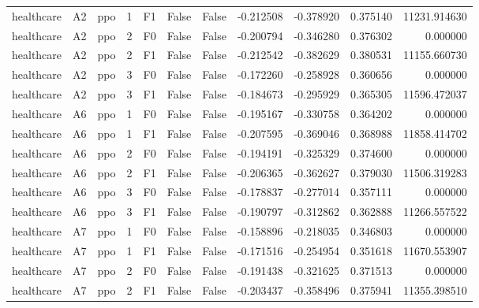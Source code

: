 \begin{tabular}{lllrlllrrrr}
healthcare &      A2 &       ppo &     1 &  F1 &           False &            False & -0.212508 & -0.378920 & 0.375140 &     11231.914630 \\
healthcare &      A2 &       ppo &     2 &  F0 &           False &            False & -0.200794 & -0.346280 & 0.376302 &         0.000000 \\
healthcare &      A2 &       ppo &     2 &  F1 &           False &            False & -0.212542 & -0.382629 & 0.380531 &     11155.660730 \\
healthcare &      A2 &       ppo &     3 &  F0 &           False &            False & -0.172260 & -0.258928 & 0.360656 &         0.000000 \\
healthcare &      A2 &       ppo &     3 &  F1 &           False &            False & -0.184673 & -0.295929 & 0.365305 &     11596.472037 \\
healthcare &      A6 &       ppo &     1 &  F0 &           False &            False & -0.195167 & -0.330758 & 0.364202 &         0.000000 \\
healthcare &      A6 &       ppo &     1 &  F1 &           False &            False & -0.207595 & -0.369046 & 0.368988 &     11858.414702 \\
healthcare &      A6 &       ppo &     2 &  F0 &           False &            False & -0.194191 & -0.325329 & 0.374600 &         0.000000 \\
healthcare &      A6 &       ppo &     2 &  F1 &           False &            False & -0.206365 & -0.362627 & 0.379030 &     11506.319283 \\
healthcare &      A6 &       ppo &     3 &  F0 &           False &            False & -0.178837 & -0.277014 & 0.357111 &         0.000000 \\
healthcare &      A6 &       ppo &     3 &  F1 &           False &            False & -0.190797 & -0.312862 & 0.362888 &     11266.557522 \\
healthcare &      A7 &       ppo &     1 &  F0 &           False &            False & -0.158896 & -0.218035 & 0.346803 &         0.000000 \\
healthcare &      A7 &       ppo &     1 &  F1 &           False &            False & -0.171516 & -0.254954 & 0.351618 &     11670.553907 \\
healthcare &      A7 &       ppo &     2 &  F0 &           False &            False & -0.191438 & -0.321625 & 0.371513 &         0.000000 \\
healthcare &      A7 &       ppo &     2 &  F1 &           False &            False & -0.203437 & -0.358496 & 0.375941 &     11355.398510 \\

\end{tabular}
